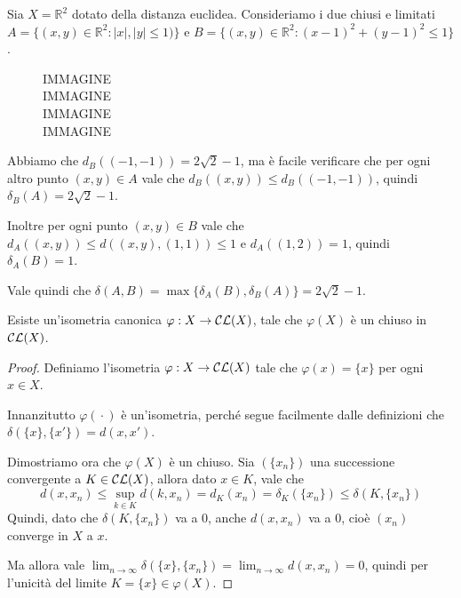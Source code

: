 \begin{example}
	Sia $X=\mathbb{R}^2$ dotato della distanza euclidea. Consideriamo i due chiusi e limitati $A=\{(x,y)\in\mathbb{R}^2:|x|,|y|\le 1)\}$ e $B=\{(x,y)\in\mathbb{R}^2:(x-1)^2+(y-1)^2\le 1\}$.
	\begin{figure}[h]
	\begin{center}
		IMMAGINE\\
		IMMAGINE\\
		IMMAGINE\\
		IMMAGINE
	\end{center}
	\end{figure}
	
	Abbiamo che $d_B((-1,-1))=2\sqrt{2}-1$, ma è facile verificare che per ogni altro punto $(x,y)\in A$ vale che $d_B((x,y))\le d_B((-1,-1))$, quindi $\delta_B(A)=2\sqrt{2}-1$.
	
	Inoltre per ogni punto $(x,y)\in B$ vale che $d_A((x,y))\le d((x,y),(1,1))\le 1$ e $d_A((1,2))=1$, quindi $\delta_A(B)=1$.
	
	Vale quindi che $\delta(A,B)=\max\{ \delta_A(B),\delta_B(A) \}=2\sqrt{2}-1$.
\end{example}


\begin{lemma}\label{IsometriaCanonica}
	Esiste un'isometria canonica $\varphi: X\to \mathcal{CL}(X)$, tale che $\varphi(X)$ è un chiuso in $\mathcal{CL}(X)$.
\end{lemma}
\begin{proof}
	Definiamo l'isometria $\varphi: X\to\mathcal{CL}(X)$ tale che $\varphi(x)=\{x\}$ per ogni $x\in X$. 
	
	Innanzitutto $\varphi({}\cdot{})$ è un'isometria, perché segue facilmente dalle definizioni che $\delta(\{ x \}, \{ x' \})=d(x,x')$.
	
	Dimostriamo ora che $\varphi(X)$ è un chiuso. Sia $(\{ x_n \})$ una successione convergente a $K\in \mathcal{CL}(X)$, allora dato $x\in K$, vale che
	\begin{equation*}
		d(x,x_n)\le \sup_{k\in K} d(k,x_n)=d_K(x_n)=\delta_K(\{x_n\})\le \delta(K,\{x_n \})
	\end{equation*}
	Quindi, dato che $\delta(K,\{x_n \})$ va a 0, anche $d(x,x_n)$ va a 0, cioè $(x_n)$ converge in $X$ a $x$. 
	
	Ma allora vale $\lim_{n\to\infty} \delta(\{x\}, \{ x_n \})=\lim_{n\to\infty} d(x,x_n)=0$, quindi per l'unicità del limite $K=\{x\}\in\varphi(X)$.
\end{proof}









